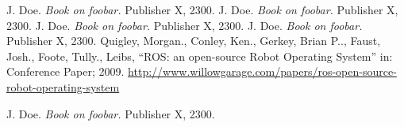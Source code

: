 \begin{thebibliography}{1}
	 J. Doe. \emph{Book on foobar.} Publisher X,
	2300.
	 J. Doe. \emph{Book on foobar.} Publisher X,
	2300.
	 J. Doe. \emph{Book on foobar.} Publisher X,
	2300.
	 J. Doe. \emph{Book on foobar.} Publisher X,
	2300.
		Quigley, Morgan., Conley, Ken., Gerkey, Brian P.., Faust, Josh., Foote, Tully., Leibs,
		``ROS: an open-source Robot Operating System'' in: Conference Paper; 2009. \url{http://www.willowgarage.com/papers/ros-open-source-robot-operating-system}	
		



	 J. Doe. \emph{Book on foobar.} Publisher X,
2300.
\end{thebibliography}
